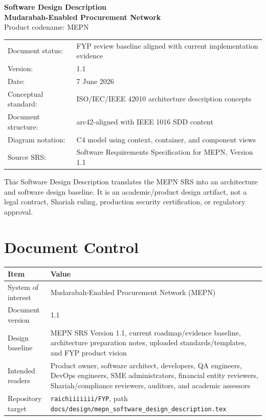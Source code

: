 \documentclass[11pt,a4paper]{article}
\newcommand{\systemname}{Mudarabah-Enabled Procurement Network}
\newcommand{\codename}{MEPN}
\begin{document}
\begin{titlepage}
\centering
{\Huge\bfseries Software Design Description\\[2mm]}
{\LARGE\bfseries \systemname\\[3mm]}
{\Large Product codename: \codename\\[8mm]}
\vfill
\begin{tabular}{ll}
Document status: & FYP review baseline aligned with current implementation evidence \\
Version: & 1.1 \\
Date: & 7 June 2026 \\
Conceptual standard: & ISO/IEC/IEEE 42010 architecture description concepts \\
Document structure: & arc42-aligned with IEEE 1016 SDD content \\
Diagram notation: & C4 model using context, container, and component views \\
Source SRS: & Software Requirements Specification for MEPN, Version 1.1 \\
\end{tabular}
\vfill
\begin{minipage}{0.88\textwidth}
This Software Design Description translates the MEPN SRS into an architecture and software design baseline. It is an academic/product design artifact, not a legal contract, Shariah ruling, production security certification, or regulatory approval.
\end{minipage}
\end{titlepage}
\tableofcontents
\listoffigures
\listoftables
\newpage
{}

\section*{Document Control}
\begin{longtable}{L{38mm}L{105mm}}
\toprule
\textbf{Item} & \textbf{Value} \\
\midrule
System of interest & \systemname{} (\codename{}) \\
Document version & 1.1 \\
Design baseline & MEPN SRS Version 1.1, current roadmap/evidence baseline, architecture preparation notes, uploaded standards/templates, and FYP product vision \\
Intended readers & Product owner, software architect, developers, QA engineers, DevOps engineers, SME administrators, financial entity reviewers, Shariah/compliance reviewers, auditors, and academic assessors \\
Repository target & \texttt{raichiiiiiii/FYP}, path \texttt{docs/design/mepn\_software\_design\_description.tex} \\
\bottomrule
\end{longtable}
\end{document}
